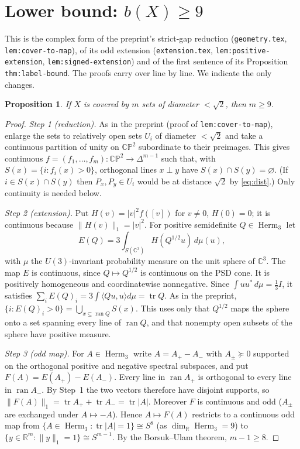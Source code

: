 \documentclass[11pt]{amsart}
\newtheorem{proposition}[theorem]{Proposition}
\theoremstyle{remark}
\newcommand{\C}{\mathbb C}
\newcommand{\R}{\mathbb R}
\newcommand{\CP}{\mathbb{CP}}
\DeclareMathOperator{\tr}{tr}
\DeclareMathOperator{\Herm}{Herm}
\begin{document}
\section{Lower bound: $b(X)\ge 9$}
This is the complex form of the preprint's strict-gap
reduction (\texttt{geometry.tex}, \texttt{lem:cover-to-map}), of its odd
extension (\texttt{extension.tex}, \texttt{lem:positive-extension},
\texttt{lem:signed-extension}) and of the first sentence of its
Proposition \texttt{thm:label-bound}. The proofs carry over line by line. We
indicate the only changes.

\begin{proposition}\label{prop:lower}
If $X$ is covered by $m$ sets of diameter $<\sqrt2$, then $m\ge 9$.
\end{proposition}
\begin{proof}
\emph{Step 1 (reduction).} As in the preprint (proof of \texttt{lem:cover-to-map}),
enlarge the sets to relatively open sets $U_i$ of diameter $<\sqrt2$ and take a
continuous partition of unity on $\CP^2$ subordinate to their preimages. This gives
continuous $f=(f_1,\dots,f_m):\CP^2\to\Delta^{m-1}$ such that, with
$S(x)=\{i:f_i(x)>0\}$, orthogonal lines $x\perp y$ have $S(x)\cap S(y)=\varnothing$.
(If $i\in S(x)\cap S(y)$ then $P_x,P_y\in U_i$ would be at distance $\sqrt2$
by \eqref{eq:dist}.) Only continuity is needed below.

\emph{Step 2 (extension).} Put $H(v)=|v|^2f([v])$ for $v\ne0$, $H(0)=0$; it is
continuous because $\|H(v)\|_1=|v|^2$. For positive semidefinite $Q\in\Herm_3$ let
\[
 E(Q)=3\int_{S(\C^3)}H(Q^{1/2}u)\,d\mu(u),
\]
with $\mu$ the $U(3)$-invariant probability measure on the unit sphere of $\C^3$.
The map $E$ is continuous, since $Q\mapsto Q^{1/2}$ is continuous on the PSD
cone. It is positively homogeneous and coordinatewise nonnegative. Since
$\int uu^*\,d\mu=\tfrac13I$, it satisfies $\sum_iE(Q)_i=3\int\langle Qu,u\rangle
d\mu=\tr Q$. As in the preprint, $\{i:E(Q)_i>0\}=\bigcup_{x\subseteq \operatorname{ran}Q}S(x)$.
This uses only that $Q^{1/2}$ maps the sphere onto a set spanning every line of
$\operatorname{ran}Q$, and that nonempty open subsets of the sphere have positive measure.

\emph{Step 3 (odd map).} For $A\in\Herm_3$ write $A=A_+-A_-$ with $A_\pm\succeq0$
supported on the orthogonal positive and negative spectral subspaces, and put
$F(A)=E(A_+)-E(A_-)$. Every line in $\operatorname{ran}A_+$ is orthogonal to
every line in $\operatorname{ran}A_-$. By Step~1 the two vectors therefore have disjoint
supports, so $\|F(A)\|_1=\tr A_++\tr A_-=\tr|A|$. Moreover $F$ is continuous and
odd ($A_\pm$ are exchanged under $A\mapsto-A$). Hence $A\mapsto F(A)$ restricts to a
continuous odd map from $\{A\in\Herm_3:\tr|A|=1\}\cong S^{8}$ (as
$\dim_\R\Herm_3=9$) to $\{y\in\R^m:\|y\|_1=1\}\cong S^{m-1}$. By the
Borsuk--Ulam theorem, $m-1\ge8$.
\end{proof}
\end{document}
